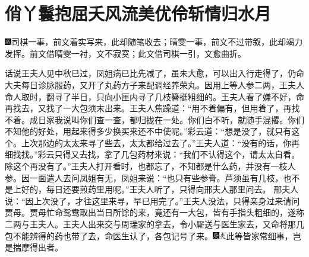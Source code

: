 
\chapter{俏丫鬟抱屈夭风流\hspace{.5em}美优伶斩情归水月}

{\includegraphics[width=3mm]{../Images/00005}\kaishu 司棋一事，前文着实写来，此却随笔收去；晴雯一事，前文不过带叙，此却竭力发挥。前文借晴雯一衬，文不寂寞；此文借司棋一引，文愈曲折。}

话说王夫人见中秋已过，凤姐病已比先减了，虽未大愈，可以出入行走得了，仍命大夫每日诊脉服药，又开了丸药方子来配调经养荣丸。因用上等人参二两，王夫人命人取时，翻寻了半日，只向小匣内寻了几枝簪挺粗细的。王夫人看了嫌不好，命再找去，又找了一大包须末出来。王夫人焦躁道：``用不着偏有，但用着了，再找不着。成日家我说叫你们查一查，都归拢在一处。你们白不听，就随手混撂。你们不知他的好处，用起来得多少换买来还不中使呢。''彩云道：``想是没了，就只有这个。上次那边的太太来寻了些去，太太都给过去了。''王夫人道：``没有的话，你再细找找。''彩云只得又去找，拿了几包药材来说：``我们不认得这个，请太太自看。除这个再没有了。''王夫人打开看时，也都忘了，不知都是什么药，并没有一枝人参。因一面遣人去问凤姐有无，凤姐来说：``也只有些参膏。芦须虽有几枝，也不是上好的，每日还要煎药里用呢。''王夫人听了，只得向邢夫人那里问去。
邢夫人说：``因上次没了，才往这里来寻，早已用完了。''王夫人没法，只得亲身过来请问贾母。贾母忙命鸳鸯取出当日所馀的来，竟还有一大包，皆有手指头粗细的，遂称二两与王夫人。王夫人出来交与周瑞家的拿去，令小厮送与医生家去，又命将那几包不能辨得的药也带了去，命医生认了，各包记号了来。{\includegraphics[width=3mm]{../Images/00004}\includegraphics[width=3mm]{../Images/00012}\footnotesize \kaishu 此等皆家常细事，岂是揣摩得出者。}

